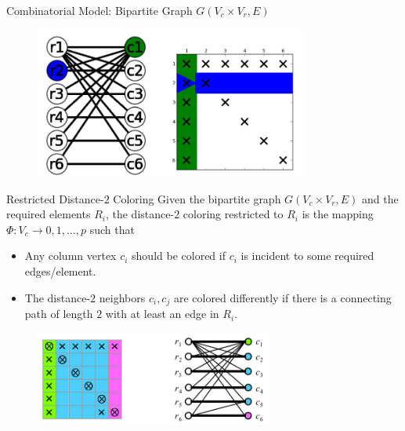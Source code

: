 \documentclass{beamer}
\begin{document}
\begin{frame}{Combinatorial Model: Bipartite Graph}
$G(V_c\times V_r,E)$
\begin{figure}
\centering
\includegraphics[width=0.8\textwidth]{bip}
\end{figure}
\end{frame}

\begin{frame}{Restricted Distance-$2$ Coloring}
Given the bipartite graph $G(V_c\times V_r,E)$ and the required elements
$R_i$, the distance-$2$ coloring restricted to $R_i$ is the mapping 
$\Phi:V_c\to {0,1,...,p}$ such that
\begin{itemize}
\item Any column vertex $c_i$ should be colored if $c_i$ is incident to some required edges/element.
\item The distance-$2$ neighbors $c_i, c_j$ are colored differently
if there is a connecting path of length $2$ with at least an edge in $R_i$.
\end{itemize}
\begin{figure}
\centering
\includegraphics[width=0.7\textwidth]{restricted_distance2}
\end{figure}
\end{frame}
\end{document}
